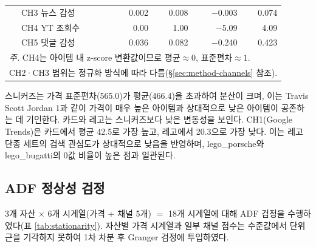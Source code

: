 \documentclass[11pt, a4paper, twocolumn]{article}
\begin{document}
\begin{table}[!tbp]
\begin{tabular}{llrrrr}
 & CH3 뉴스 감성     &   0.002 &  0.008 &  $-$0.003 & 0.074 \\
 & CH4 YT 조회수     &   0.00 &   1.00 &  $-$5.09 &  4.09 \\
 & CH5 댓글 감성     &   0.036 &  0.082 &  $-$0.240 & 0.423 \\
\bottomrule
\multicolumn{6}{l}{\textit{주.} CH4는 아이템 내 z-score 변환값이므로 평균$\approx 0$, 표준편차$\approx 1$.}\\
\multicolumn{6}{l}{\hspace{1em}CH2·CH3 범위는 정규화 방식에 따라 다름(\S\ref{sec:method-channels} 참조).}\\
\end{tabular}
\end{table}

스니커즈는 가격 표준편차(565.0)가 평균(466.4)을 초과하여 분산이 크며, 이는
Travis Scott Jordan 1과 같이 가격이 매우 높은 아이템과 상대적으로 낮은
아이템이 공존하는 데 기인한다. 카드와 레고는 스니커즈보다 낮은 변동성을 보인다.
CH1(Google Trends)은 카드에서 평균 42.5로 가장 높고, 레고에서 20.3으로
가장 낮다. 이는 레고 단종 세트의 검색 관심도가 상대적으로 낮음을 반영하며,
lego\_porsche와 lego\_bugatti의 0값 비율이 높은 점과 일관된다.

\subsection{ADF 정상성 검정}\label{sec:results-adf}

3개 자산 $\times$ 6개 시계열(가격 + 채널 5개) $=$ 18개 시계열에 대해
ADF 검정을 수행하였다(표 \ref{tab:stationarity}). 자산별 가격 시계열과
일부 채널 점수는 수준값에서 단위근을 기각하지 못하여 1차 차분 후
Granger 검정에 투입하였다.
\end{document}
